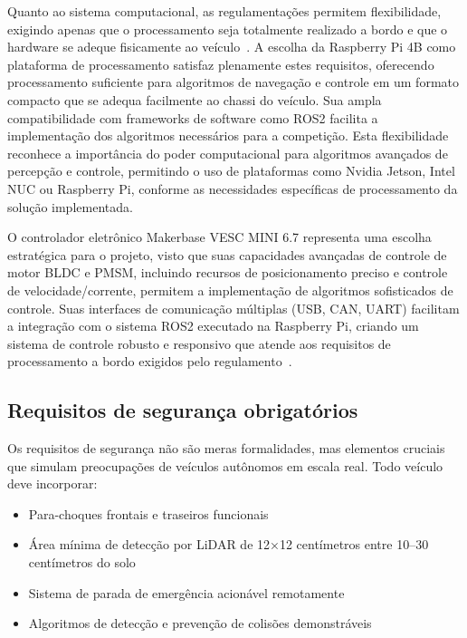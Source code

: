 Quanto ao sistema computacional, as regulamentações permitem flexibilidade,
exigindo apenas que o processamento seja totalmente realizado a bordo e que o
hardware se adeque fisicamente ao veículo~\cite{F1TENTHRules2023}. A escolha da
Raspberry Pi 4B como plataforma de processamento satisfaz plenamente estes
requisitos, oferecendo processamento suficiente para algoritmos de navegação e
controle em um formato compacto que se adequa facilmente ao chassi do veículo.
Sua ampla compatibilidade com frameworks de software como ROS2 facilita a
implementação dos algoritmos necessários para a competição. Esta flexibilidade
reconhece a importância do poder computacional para algoritmos avançados de
percepção e controle, permitindo o uso de plataformas como Nvidia Jetson, Intel
NUC ou Raspberry Pi, conforme as necessidades específicas de processamento da
solução implementada.

O controlador eletrônico Makerbase VESC MINI 6.7 representa uma escolha
estratégica para o projeto, visto que suas capacidades avançadas de controle de
motor BLDC e PMSM, incluindo recursos de posicionamento preciso e controle de
velocidade/corrente, permitem a implementação de algoritmos sofisticados de
controle. Suas interfaces de comunicação múltiplas (USB, CAN, UART) facilitam a
integração com o sistema ROS2 executado na Raspberry Pi, criando um sistema de
controle robusto e responsivo que atende aos requisitos de processamento a
bordo exigidos pelo regulamento~\cite{F1TENTHRules2023}.

\subsection{Requisitos de segurança obrigatórios}

Os requisitos de segurança não são meras formalidades, mas elementos cruciais
que simulam preocupações de veículos autônomos em escala real. Todo veículo
deve incorporar:

\begin{itemize}
      \item Para-choques frontais e traseiros funcionais
      \item Área mínima de detecção por LiDAR de 12×12 centímetros entre 10--30 centímetros do solo
      \item Sistema de parada de emergência acionável remotamente
      \item Algoritmos de detecção e prevenção de colisões demonstráveis
\end{itemize}

